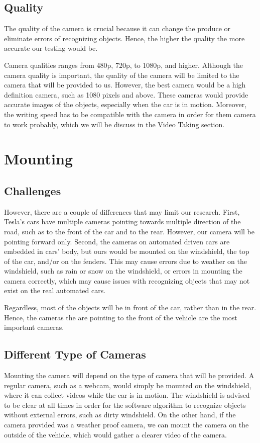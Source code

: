 \documentclass[10pt,draftclsnofoot,onecolumn,journal,compsoc]{IEEEtran}
\begin{document}
\subsection{Quality}
The quality of the camera is crucial because it can change the produce or eliminate errors of recognizing objects. Hence, the higher the quality the more accurate our testing would be. 

Camera qualities ranges from 480p, 720p, to 1080p, and higher. Although the camera quality is important, the quality of the camera will be limited to the camera that will be provided to us. However, the best camera would be a high definition camera, such as 1080 pixels and above. These cameras would provide accurate images of the objects, especially when the car is in motion. Moreover, the writing speed has to be compatible with the camera in order for them camera to work probably, which we will be discuss in the Video Taking section.


\section{Mounting}
\subsection{Challenges}
However, there are a couple of differences that may limit our research. First, Tesla’s cars have multiple cameras pointing towards multiple direction of the road, such as to the front of the car and to the rear. However, our camera will be pointing forward only. Second, the cameras on automated driven cars are embedded in cars' body, but ours would be mounted on the windshield, the top of the car, and/or on the fenders. This may cause errors due to weather on the windshield, such as rain or snow on the windshield, or errors in mounting the camera correctly, which may cause issues with recognizing objects that may not exist on the real automated cars. 

Regardless, most of the objects will be in front of the car, rather than in the rear. Hence, the cameras the are pointing to the front of the vehicle are the most important cameras.

\subsection{Different Type of Cameras}
Mounting the camera will depend on the type of camera that will be provided. A regular camera, such as a webcam, would simply be mounted on the windshield, where it can collect videos while the car is in motion. The windshield is advised to be clear at all times in order for the software algorithm to recognize objects without external errors, such as dirty windshield. On the other hand, if the camera provided was a weather proof camera, we can mount the camera on the outside of the vehicle, which would gather a clearer video of the camera. 
\end{document}
